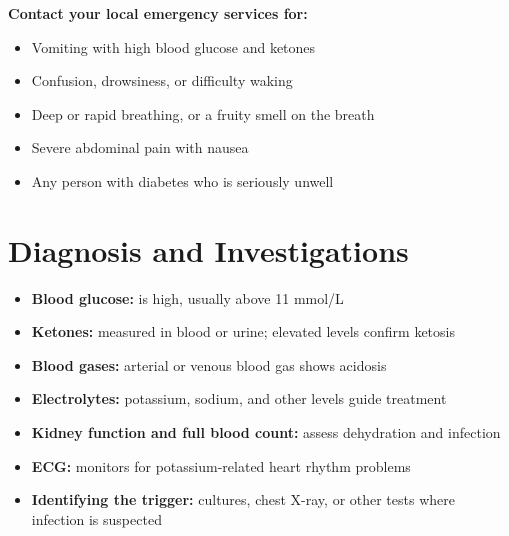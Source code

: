 \textbf{Contact your local emergency services for:}
\begin{itemize}
    \item Vomiting with high blood glucose and ketones
    \item Confusion, drowsiness, or difficulty waking
    \item Deep or rapid breathing, or a fruity smell on the breath
    \item Severe abdominal pain with nausea
    \item Any person with diabetes who is seriously unwell
\end{itemize}

\section*{Diagnosis and Investigations}
\begin{itemize}
    \item \textbf{Blood glucose:} is high, usually above 11 mmol/L
    \item \textbf{Ketones:} measured in blood or urine; elevated levels confirm ketosis
    \item \textbf{Blood gases:} arterial or venous blood gas shows acidosis
    \item \textbf{Electrolytes:} potassium, sodium, and other levels guide treatment
    \item \textbf{Kidney function and full blood count:} assess dehydration and infection
    \item \textbf{ECG:} monitors for potassium-related heart rhythm problems
    \item \textbf{Identifying the trigger:} cultures, chest X-ray, or other tests where infection is suspected
\end{itemize}

